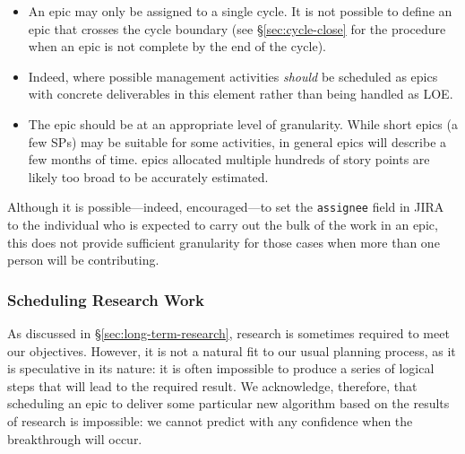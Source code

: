 \begin{itemize}
\item An \gls{epic} may only be assigned to a single \gls{cycle}.
  It is not possible to define an \gls{epic} that crosses the \gls{cycle} boundary (see \S\ref{sec:cycle-close} for the procedure when an \gls{epic} is not complete by the end of the \gls{cycle}).
\item Indeed, where possible management activities \emph{should} be scheduled as \glspl{epic} with concrete deliverables in this \gls{element} rather than being handled as \gls{LOE}.
\item The \gls{epic} should be at an appropriate level of granularity.
  While short \glspl{epic} (a few \glspl{SP}) may be suitable for some activities, in general \glspl{epic} will describe a few months of time.
  \Glspl{epic} allocated multiple hundreds of \gls{story} points are likely too broad to be accurately estimated.
\end{itemize}


Although it is possible---indeed, encouraged---to set the \texttt{assignee} field in \gls{JIRA} to the individual who is expected to carry out the bulk of the work in an \gls{epic}, this does not provide sufficient granularity for those cases when more than one person will be contributing.



\subsubsection{Scheduling Research Work} \label{sec:research}

As discussed in \S\ref{sec:long-term-research}, research is sometimes required
to meet our objectives. However, it is not a natural fit to our usual
planning process, as it is speculative in its nature: it is often
impossible to produce a series of logical steps that will lead to the
required result. We acknowledge, therefore, that scheduling an \gls{epic} to
deliver some particular new \gls{algorithm} based on the results of research
is impossible: we cannot predict with any confidence when the
breakthrough will occur.


